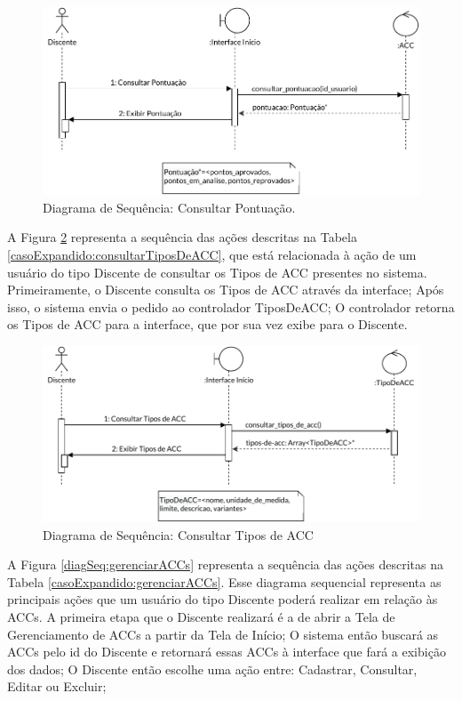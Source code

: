 \begin{figure}[H]
    \centering
    \includegraphics[width=\textwidth]{dados/figuras/Proposta/DiagramasDeSequencia/Consultar Pontuação.pdf}
    \caption{Diagrama de Sequência: Consultar Pontuação.}
    \label{diagSeq:consultarPontuacao}
\end{figure}

A Figura \ref{diagSeq:consultarTiposDeACC} representa a sequência das ações descritas na Tabela \ref{casoExpandido:consultarTiposDeACC}, que está relacionada à ação de um usuário do tipo Discente de consultar os Tipos de ACC presentes no sistema. Primeiramente, o Discente consulta os Tipos de ACC através da interface; Após isso, o sistema envia o pedido ao controlador TiposDeACC; O controlador retorna os Tipos de ACC para a interface, que por sua vez exibe para o Discente.

\begin{figure}[H]
    \centering 
    \includegraphics[width=\textwidth]{dados/figuras/Proposta/DiagramasDeSequencia/Consultar Tipos de ACC.pdf}
    \caption{Diagrama de Sequência: Consultar Tipos de ACC}
    \label{diagSeq:consultarTiposDeACC}
\end{figure}


A Figura \ref{diagSeq:gerenciarACCs} representa a sequência das ações descritas na Tabela \ref{casoExpandido:gerenciarACCs}. Esse diagrama sequencial representa as principais ações que um usuário do tipo Discente poderá realizar em relação às ACCs. A primeira etapa que o Discente realizará é a de abrir a Tela de Gerenciamento de ACCs a partir da Tela de Início; O sistema então buscará as ACCs pelo id do Discente e retornará essas ACCs à interface que fará a exibição dos dados; O Discente então escolhe uma ação entre: Cadastrar, Consultar, Editar ou Excluir; 

